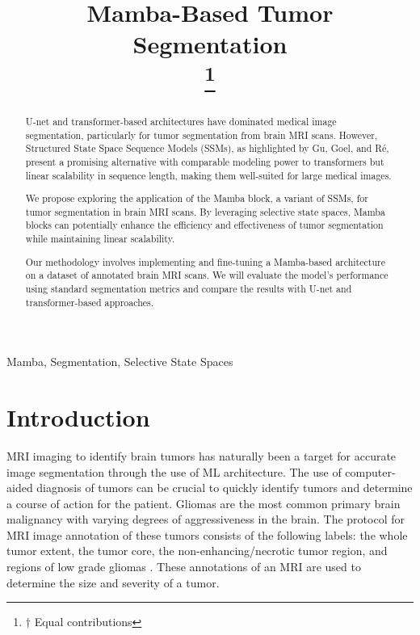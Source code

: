 \documentclass[conference]{IEEEtran}
\begin{document}
\title{Mamba-Based Tumor Segmentation\\
\thanks{$\dagger$ Equal contributions}
}

\author{
\and
{}
}

\maketitle

\begin{abstract}
U-net and transformer-based architectures have dominated medical image segmentation, particularly for tumor segmentation from brain MRI scans. However, Structured State Space Sequence Models (SSMs), as highlighted by Gu, Goel, and Ré, present a promising alternative with comparable modeling power to transformers but linear scalability in sequence length, making them well-suited for large medical images.

We propose exploring the application of the Mamba block, a variant of SSMs, for tumor segmentation in brain MRI scans. By leveraging selective state spaces, Mamba blocks can potentially enhance the efficiency and effectiveness of tumor segmentation while maintaining linear scalability.

Our methodology involves implementing and fine-tuning a Mamba-based architecture on a dataset of annotated brain MRI scans. We will evaluate the model's performance using standard segmentation metrics and compare the results with U-net and transformer-based approaches.
\end{abstract}

\begin{IEEEkeywords}
Mamba, Segmentation, Selective State Spaces
\end{IEEEkeywords}

\section{Introduction}
MRI imaging to identify brain tumors has naturally been a target for accurate image segmentation through the use of ML architecture. The use of computer-aided diagnosis of tumors can be crucial to quickly identify tumors and determine a course of action for the patient. Gliomas are the most common primary brain malignancy with varying degrees of aggressiveness in the brain. The protocol for MRI image annotation of these tumors consists of the following labels: the whole tumor extent, the tumor core, the non-enhancing/necrotic tumor region, and regions of low grade gliomas \cite{bakas2019identifying}. These annotations of an MRI are used to determine the size and severity of a tumor.
	
\end{document}
